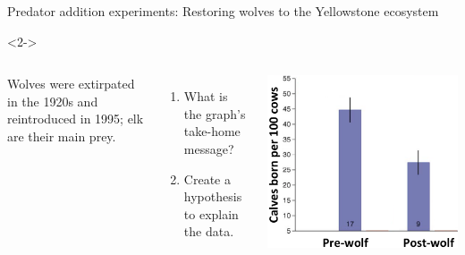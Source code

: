\begin{frame}[t]
    \begin{adjustwidth}{-2em}{-1.5em}
        \vspace{-3mm}
        Predator addition experiments: Restoring wolves to the Yellowstone
        ecosystem

        \begin{uncoverenv}<2->
        \begin{columns}


        \vspace{2mm}
        Wolves were extirpated in the 1920s and reintroduced in 1995; elk are
        their main prey.

        \begin{enumerate}
            \item What is the graph's take-home message?


            \item Create a hypothesis to explain the data.

        \end{enumerate}


        \includegraphics[width=\columnwidth]{elk.png}

        \end{columns}
        \end{uncoverenv}

    \end{adjustwidth}
\end{frame}

